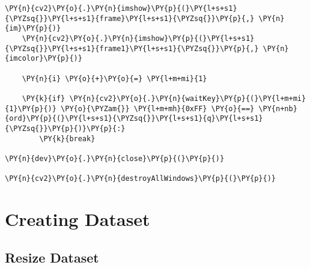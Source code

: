 \begin{tcolorbox}[breakable, size=fbox, boxrule=1pt, pad at break*=1mm,colback=cellbackground, colframe=cellborder]
\begin{Verbatim}[commandchars=\\\{\}]
    \PY{n}{cv2}\PY{o}{.}\PY{n}{imshow}\PY{p}{(}\PY{l+s+s1}{\PYZsq{}}\PY{l+s+s1}{frame}\PY{l+s+s1}{\PYZsq{}}\PY{p}{,} \PY{n}{im}\PY{p}{)}
    \PY{n}{cv2}\PY{o}{.}\PY{n}{imshow}\PY{p}{(}\PY{l+s+s1}{\PYZsq{}}\PY{l+s+s1}{frame1}\PY{l+s+s1}{\PYZsq{}}\PY{p}{,} \PY{n}{imcolor}\PY{p}{)}

    \PY{n}{i} \PY{o}{+}\PY{o}{=} \PY{l+m+mi}{1}

    \PY{k}{if} \PY{n}{cv2}\PY{o}{.}\PY{n}{waitKey}\PY{p}{(}\PY{l+m+mi}{1}\PY{p}{)} \PY{o}{\PYZam{}} \PY{l+m+mh}{0xFF} \PY{o}{==} \PY{n+nb}{ord}\PY{p}{(}\PY{l+s+s1}{\PYZsq{}}\PY{l+s+s1}{q}\PY{l+s+s1}{\PYZsq{}}\PY{p}{)}\PY{p}{:}
        \PY{k}{break}

\PY{n}{dev}\PY{o}{.}\PY{n}{close}\PY{p}{(}\PY{p}{)}

\PY{n}{cv2}\PY{o}{.}\PY{n}{destroyAllWindows}\PY{p}{(}\PY{p}{)}
\end{Verbatim}
\end{tcolorbox}

    \hypertarget{creating-dataset}{%
\section{\texorpdfstring{\textbf{Creating
Dataset}}{Creating Dataset}}\label{creating-dataset}}

\subsection{    Resize Dataset}

